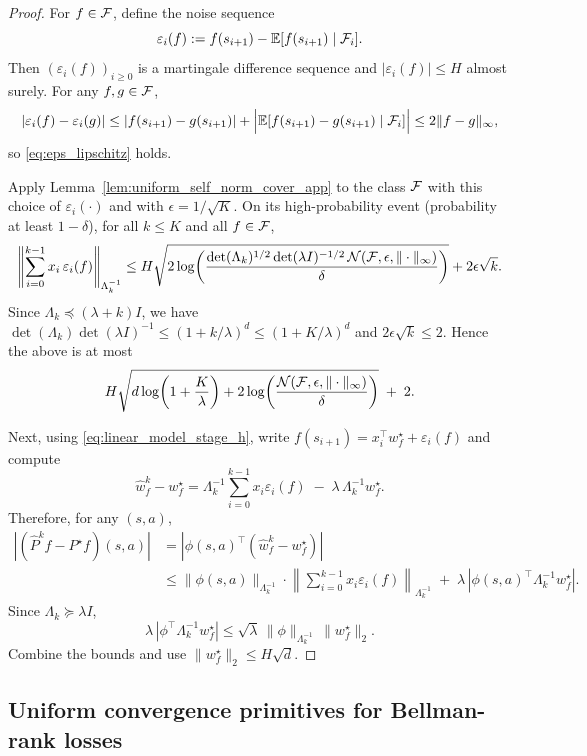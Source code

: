 \begin{proof}
For $f\in\mathcal{F}$, define the noise sequence
\[
\varepsilon_i(f) := f(s_{i+1}) - \mathbb{E}[f(s_{i+1})\mid \mathcal{F}_i].
\]
Then $(\varepsilon_i(f))_{i\ge 0}$ is a martingale difference sequence and
$|\varepsilon_i(f)|\le H$ almost surely.
For any $f,g\in\mathcal{F}$,
\[
|\varepsilon_i(f)-\varepsilon_i(g)|
\le |f(s_{i+1})-g(s_{i+1})|
+ \Big|\mathbb{E}[f(s_{i+1})-g(s_{i+1})\mid \mathcal{F}_i]\Big|
\le 2\|f-g\|_\infty,
\]
so \eqref{eq:eps_lipschitz} holds.

Apply Lemma~\ref{lem:uniform_self_norm_cover_app} to the class $\mathcal{F}$ with this choice of
$\varepsilon_i(\cdot)$ and with $\epsilon=1/\sqrt K$.  On its high-probability event (probability
at least $1-\delta$), for all $k\le K$ and all $f\in\mathcal{F}$,
\[
\left\|\sum_{i=0}^{k-1} x_i\,\varepsilon_i(f)\right\|_{\Lambda_k^{-1}}
\le
H\sqrt{2\log\!\left(\frac{\det(\Lambda_k)^{1/2}\det(\lambda I)^{-1/2}\,\mathcal{N}(\mathcal{F},\epsilon,\|\cdot\|_\infty)}{\delta}\right)}
+
2\epsilon\sqrt{k}.
\]
Since $\Lambda_k \preceq (\lambda+k)I$, we have
$\det(\Lambda_k)\det(\lambda I)^{-1}\le (1+k/\lambda)^d \le (1+K/\lambda)^d$ and
$2\epsilon\sqrt{k}\le 2$. Hence the above is at most
\[
H\sqrt{d\log\!\left(1+\frac{K}{\lambda}\right)
+
2\log\!\left(\frac{\mathcal{N}(\mathcal{F},\epsilon,\|\cdot\|_\infty)}{\delta}\right)}
\;+\;2.
\]

Next, using \eqref{eq:linear_model_stage_h}, write $f(s_{i+1}) = x_i^\top w_f^\star + \varepsilon_i(f)$ and compute
\[
\widehat w_f^k - w_f^\star
=
\Lambda_k^{-1}\sum_{i=0}^{k-1} x_i\varepsilon_i(f) \;-\; \lambda\,\Lambda_k^{-1} w_f^\star.
\]
Therefore, for any $(s,a)$,
\begin{align*}
|(\widehat P^k f - P^\star f)(s,a)|
&=
|\phi(s,a)^\top(\widehat w_f^k - w_f^\star)| \\
&\le
\|\phi(s,a)\|_{\Lambda_k^{-1}}\cdot
\left\|\sum_{i=0}^{k-1} x_i\varepsilon_i(f)\right\|_{\Lambda_k^{-1}}
\;+\;
\lambda\,|\phi(s,a)^\top \Lambda_k^{-1}w_f^\star|.
\end{align*}
Since $\Lambda_k\succeq \lambda I$,
\[
\lambda\,|\phi^\top \Lambda_k^{-1}w_f^\star|
\le
\sqrt{\lambda}\,\|\phi\|_{\Lambda_k^{-1}}\,\|w_f^\star\|_2.
\]
Combine the bounds and use $\|w_f^\star\|_2\le H\sqrt d$.
\end{proof}

\subsection{Uniform convergence primitives for Bellman-rank losses}
\label{subsec:br_epsgen_appendix}


